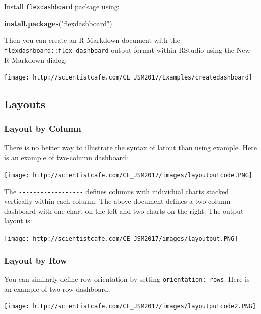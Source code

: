 \documentclass[]{book}
\newenvironment{Shaded}{\begin{snugshade}}{\end{snugshade}}
\newcommand{\KeywordTok}[1]{\textcolor[rgb]{0.13,0.29,0.53}{\textbf{{#1}}}}
\newcommand{\StringTok}[1]{\textcolor[rgb]{0.31,0.60,0.02}{{#1}}}
\newcommand{\NormalTok}[1]{{#1}}
\theoremstyle{definition}
\theoremstyle{definition}
\theoremstyle{remark}
\begin{document}
Install \texttt{flexdashboard} package using:

\begin{Shaded}
\begin{Highlighting}[]
\KeywordTok{install.packages}\NormalTok{(}\StringTok{"flexdashboard"}\NormalTok{)}
\end{Highlighting}
\end{Shaded}

Then you can create an R Markdown document with the
\texttt{flexdashboard::flex\_dashboard} output format within RStudio
using the New R Markdown dialog:

\begin{center}\texttt{[image: http://scientistcafe.com/CE\_JSM2017/Examples/createdashboard]} \end{center}

\subsection{Layouts}\label{layouts}

\subsubsection{Layout by Column}\label{layout-by-column}

There is no better way to illustrate the syntax of latout than using
example. Here is an example of two-column dashboard:

\texttt{[image: http://scientistcafe.com/CE\_JSM2017/images/layoutputcode.PNG]}

 The \texttt{-\/-\/-\/-\/-\/-\/-\/-\/-\/-\/-\/-\/-\/-\/-\/-\/-\/-}
defines columns with individual charts stacked vertically within each
column. The above document defines a two-column dashboard with one chart
on the left and two charts on the right. The output layout is:

\texttt{[image: http://scientistcafe.com/CE\_JSM2017/images/layoutput.PNG]}

\subsubsection{Layout by Row}\label{layout-by-row}

You can similarly define row orientation by setting
\texttt{orientation:\ rows}. Here is an example of two-row dashboard:

\texttt{[image: http://scientistcafe.com/CE\_JSM2017/images/layoutputcode2.PNG]}
\end{document}
